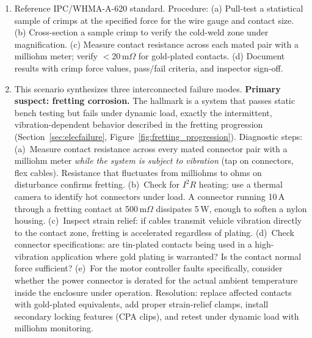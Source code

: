 \begin{enumerate}[leftmargin=1.5em]
  \item Reference IPC/WHMA-A-620 standard. Procedure: (a) Pull-test a statistical sample of crimps at the specified force for the wire gauge and contact size. (b) Cross-section a sample crimp to verify the cold-weld zone under magnification. (c) Measure contact resistance across each mated pair with a milliohm meter; verify $<$20\,m$\Omega$ for gold-plated contacts. (d) Document results with crimp force values, pass/fail criteria, and inspector sign-off.

  \item This scenario synthesizes three interconnected failure modes. \textbf{Primary suspect: fretting corrosion.} The hallmark is a system that passes static bench testing but fails under dynamic load, exactly the intermittent, vibration-dependent behavior described in the fretting progression (Section~\ref{sec:elecfailure}, Figure~\ref{fig:fretting_progression}). Diagnostic steps: (a)~Measure contact resistance across every mated connector pair with a milliohm meter \emph{while the system is subject to vibration} (tap on connectors, flex cables). Resistance that fluctuates from milliohms to ohms on disturbance confirms fretting. (b)~Check for $I^2R$ heating: use a thermal camera to identify hot connectors under load. A connector running 10\,A through a fretting contact at 500\,m$\Omega$ dissipates 5\,W, enough to soften a nylon housing. (c)~Inspect strain relief: if cables transmit vehicle vibration directly to the contact zone, fretting is accelerated regardless of plating. (d)~Check connector specifications: are tin-plated contacts being used in a high-vibration application where gold plating is warranted? Is the contact normal force sufficient? (e)~For the motor controller faults specifically, consider whether the power connector is derated for the actual ambient temperature inside the enclosure under operation. Resolution: replace affected contacts with gold-plated equivalents, add proper strain-relief clamps, install secondary locking features (CPA clips), and retest under dynamic load with milliohm monitoring.
\end{enumerate}




